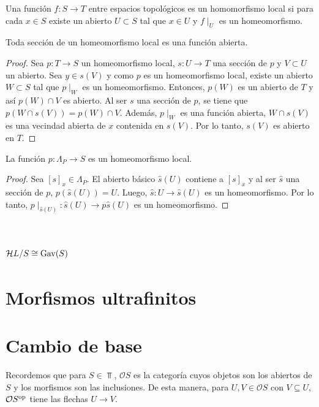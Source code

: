 \begin{definition}
Una función $f\colon S\to T$ entre espacios topológicos es un homomorfismo local si para cada $x\in S$ existe un abierto $U\subset S$ tal que $x\in U$ y $f\mid_U$ es un homeomorfismo.
\end{definition}

\begin{lema}
Toda sección de un homeomorfismo local es una función abierta.
\end{lema}

\begin{proof}
Sea $p\colon T\to S$ un homeomorfismo local, $s\colon U\to T$ una sección de $p$ y $V\subset U$ un abierto. Sea $y\in s(V)$ y como $p$ es un homeomorfismo local, existe un abierto $W\subset S$ tal que $p\mid_W$ es un homeomorfismo. Entonces, $p(W)$ es un abierto de $T$ y así $p(W)\cap V$ es abierto. Al ser $s$ una sección de $p$, se tiene que $p(W\cap s(V))=p(W)\cap V$. Además, $p\mid_W$ es una función abierta, $W\cap s(V)$ es una vecindad abierta de $x$ contenida en $s(V)$. Por lo tanto, $s(V)$ es abierto en $T$.
\end{proof}

\begin{lema}
La función $p\colon \Lambda_P\to S$ es un homeomorfismo local.
\end{lema}

\begin{proof}
Sea $[s]_x\in \Lambda_P$. El abierto básico $\hat{s}(U)$ contiene a $[s]_x$ y al ser $\hat{s}$ una sección de $p$, $p(\hat{s}(U))=U$. Luego, $\hat{s}\colon U\to \hat{s}(U)$ es un homeomorfismo. Por lo tanto, $p\mid_{\hat{s}(U)}\colon \hat{s}(U)\to p\hat{s}(U)$ es un homeomorfismo.
\end{proof}

\section{${\mathcal H} L/S\cong {\mathrm{Gav}}(S)$}

\section{Morfismos ultrafinitos}

\section{Cambio de base}

Recordemos que para $S\in \Top$, $\mathcal{O}S$ es la categoría cuyos objetos son los abiertos de $S$ y los morfismos son las 
inclusiones. De esta manera, para $U, V\in \mathcal{O}S$ con $V\subseteq U$, $\mathcal{O}S^{{\mathrm{op}}}$ tiene las flechas $U\to V$.\\

